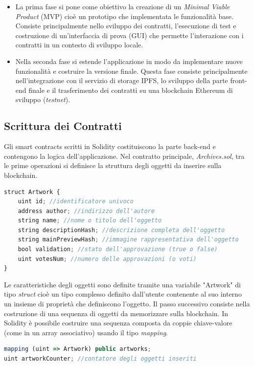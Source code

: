 \begin{itemize}

\item La prima fase si pone come obiettivo la creazione di un \emph{Minimal Viable Product} (MVP) cioè un prototipo che implementata le funzionalità base. Consiste principalmente nello sviluppo dei contratti, l'esecuzione di test e costruzione di un'interfaccia di prova (GUI) che permette l'interazione con i contratti in un contesto di sviluppo locale.

\item Nella seconda fase si estende l'applicazione in modo da implementare nuove funzionalità e costruire la versione finale. Questa fase consiste principalmente nell'integrazione con il servizio di storage IPFS, lo sviluppo della parte front-end finale e il trasferimento dei contratti su una blockchain Ethereum di sviluppo (\emph{testnet}).

\end{itemize}

\subsection{Scrittura dei Contratti}

Gli smart contracts scritti in Solidity costituiscono la parte back-end e contengono la logica dell'applicazione. Nel contratto principale, \emph{Archives.sol}, tra le prime operazioni si definisce la struttura degli oggetti da inserire sulla blockchain.
\\
\begin{lstlisting}[caption={Struttura degli oggetti},language=JavaScript]
struct Artwork {
    uint id; //identificatore univoco
    address author; //indirizzo dell'autore
    string name; //nome o titolo dell'oggetto
    string descriptionHash; //descrizione completa dell'oggetto
    string mainPreviewHash; //immagine rappresentativa dell'oggetto
    bool validation; //stato dell'approvazione (true o false)
    uint votesNum; //numero delle approvazioni (o voti)
}
\end{lstlisting}

Le caratteristiche degli oggetti sono definite tramite una variabile "Artwork" di tipo \emph{struct} cioè un tipo complesso definito dall'utente contenente al suo interno un insieme di proprietà che definiscono l'oggetto. Il passo successivo consiste nella costruzione di una sequenza di oggetti da memorizzare sulla blockchain. In Solidity è possibile costruire una sequenza composta da coppie chiave-valore (come in un array associativo) usando il tipo \emph{mapping}.
\\
\begin{lstlisting}[caption={Associazione chiave-valore},language=JavaScript]
mapping (uint => Artwork) public artworks;
uint artworkCounter; //contatore degli oggetti inseriti 
\end{lstlisting}

